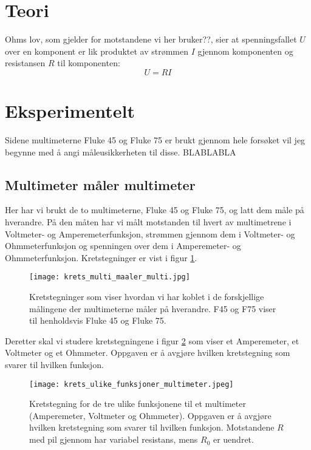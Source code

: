 \documentclass[reprint, english,notitlepage]{revtex4-1}  %
\begin{document}
\section{Teori}

Ohms lov, som gjelder for motstandene vi her bruker??, sier at spenningsfallet $U$ over en komponent er lik produktet av strømmen $I$ gjennom komponenten og resistansen $R$ til komponenten:
\begin{equation}
  \label{eq:ohms_lov}
  U = R I
\end{equation}



\section{Eksperimentelt}

Sidene multimeterne Fluke 45 og Fluke 75 er brukt gjennom hele forsøket vil jeg begynne med å angi måleusikkerheten til disse. BLABLABLA

\subsection{Multimeter måler multimeter}
Her har vi brukt de to multimeterne, Fluke 45 og Fluke 75, og latt dem måle på hverandre. På den måten har vi målt motstanden til hvert av multimetrene i Voltmeter- og Amperemeterfunksjon, strømmen gjennom dem i Voltmeter- og Ohmmeterfunksjon og spenningen over dem i Amperemeter- og Ohmmeterfunksjon. Kretstegninger er vist i figur \ref{fig:krets_multi_maaler_multi}.
\begin{figure}
  \texttt{[image: krets\_multi\_maaler\_multi.jpg]}
  \caption{Kretstegninger som viser hvordan vi har koblet i de forskjellige målingene der multimeterne måler på hverandre. F45 og F75 viser til henholdsvis Fluke 45 og Fluke 75.}
  \label{fig:krets_multi_maaler_multi}
\end{figure}

Deretter skal vi studere kretstegningene i figur \ref{fig:krets_ulike_funksjoner_multimeter} som viser et Amperemeter, et Voltmeter og et Ohmmeter. Oppgaven er å avgjøre hvilken kretstegning som svarer til hvilken funksjon.
\begin{figure}
  \texttt{[image: krets\_ulike\_funksjoner\_multimeter.jpeg]}
  \caption{Kretstegning for de tre ulike funksjonene til et multimeter (Amperemeter, Voltmeter og Ohmmeter). Oppgaven er å avgjøre hvilken kretstegning som svarer til hvilken funksjon. Motstandene $R$ med pil gjennom har variabel resistans, mens $R_0$ er uendret.}
  \label{fig:krets_ulike_funksjoner_multimeter}
\end{figure}
\end{document}
